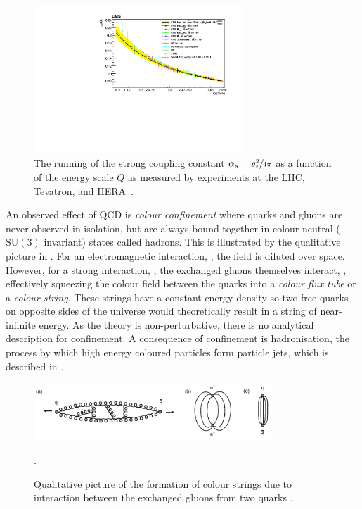 \begin{figure}[h]
	\centering
	\includegraphics[width=0.7\textwidth]{Figures/standard_model/running}
	\caption{The running of the strong coupling constant $\alpha_s = \sfrac{g_s^2}{4\pi}$ as a function of the energy scale $Q$ as measured by experiments at the LHC, Tevatron, and HERA~\cite{CMSRunning}.}
	\label{fig:asymptotic_freedom}
\end{figure}

An observed effect of QCD is \textit{colour confinement} where quarks and gluons are never observed in isolation, but are always bound together in colour-neutral ($\text{SU}(3)$ invariant) states called hadrons.
This is illustrated by the qualitative picture in .
For an electromagnetic interaction, , the field is diluted over space.
However, for a strong interaction, , the exchanged gluons themselves interact, , effectively squeezing the colour field between the quarks into a \textit{colour flux tube} or a \textit{colour string}.
These strings have a constant energy density so two free quarks on opposite sides of the universe would theoretically result in a string of near-infinite energy.
As the theory is non-perturbative, there is no analytical description for confinement.
A consequence of confinement is hadronisation, the process by which high energy coloured particles form particle jets, which is described in .

\begin{figure}[h]
	\centering
	\includegraphics[width=0.8\textwidth]{Figures/standard_model/confinement.pdf}
	\begin{subfigure}{0pt}\label{fig:confinement_a}\end{subfigure}
	\begin{subfigure}{0pt}\label{fig:confinement_b}\end{subfigure}
	\begin{subfigure}{0pt}\label{fig:confinement_c}\end{subfigure}
	\caption{Qualitative picture of the formation of colour strings due to interaction between the exchanged gluons from two quarks \cite{ModernParticlePhysics}.}.
	\label{fig:confinement}
\end{figure}

